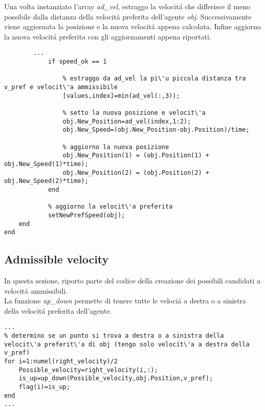  Una volta instanziato l'array \textit{ad\_vel}, estraggo la velocit\'a che differisce il meno possibile dalla distanza della velocit\'a preferita dell'agente \textit{obj}. Successivamente viene aggiornata la posizione e  la nuova velocit\'a appena calcolata. Infine aggiorno la nuova velocit\'a preferita con  gli aggiornamenti appena riportati. 
\\
\begin{lstlisting}
	    ...
            if speed_ok == 1
            
            	% estraggo da ad_vel la pi\'u piccola distanza tra v_pref e velocit\'a ammissibile    
            	[values,index]=min(ad_vel(:,3));
            
            	% setto la nuova posizione e velocit\'a
            	obj.New_Position=ad_vel(index,1:2);    
            	obj.New_Speed=(obj.New_Position-obj.Position)/time;
           
            	% aggiorno la nuova posizione
            	obj.New_Position(1) = (obj.Position(1) + obj.New_Speed(1)*time);
            	obj.New_Position(2) = (obj.Position(2) + obj.New_Speed(2)*time);
            end
            
            % aggiorno la velocit\'a preferita
            setNewPrefSpeed(obj);   
    end
end 
\end{lstlisting}

\subsection{Admissible velocity}
In questa sezione, riporto parte del codice della creazione dei possibili candidati a velocit\'a ammissibili.
\\La funzione \textit{up\_down} permette di tenere tutte le veloci\'a a destra o a sinistra della velocit\'a preferita dell'agente.

\begin{lstlisting}
...
% determino se un punto si trova a destra o a sinistra della velocit\'a preferit\'a di obj (tengo solo velocit\'a a destra della v_pref)
for i=1:numel(right_velocity)/2
    Possible_velocity=right_velocity(i,:);
    is_up=up_down(Possible_velocity,obj.Position,v_pref);
    flag(i)=is_up;
end
...
 \end{lstlisting}
 
 \newpage
